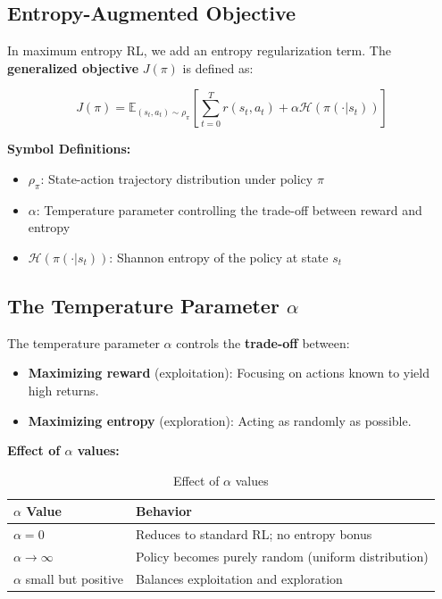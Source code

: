 \documentclass[12pt,a4paper]{article}
\theoremstyle{noteplain}
\theoremstyle{noteexercise}
\begin{document}
\subsection{Entropy-Augmented Objective}\label{ssec:entropy-obj}



In maximum entropy RL, we add an entropy regularization term. The \textbf{generalized objective} $J(\pi)$ is defined as:

\begin{equation}\label{eq:maxent-obj}
\boxed{J(\pi) = \mathbb{E}_{(s_t, a_t) \sim \rho_\pi}\left[\sum_{t=0}^{T} r(s_t, a_t) + \alpha \mathcal{H}(\pi(\cdot|s_t))\right]}
\end{equation}

\textbf{Symbol Definitions:}

\begin{itemize}
  \setlength{\itemsep}{0.2em}
  \item $\rho_\pi$: State-action trajectory distribution under policy $\pi$
  \item $\alpha$: Temperature parameter controlling the trade-off between reward and entropy
  \item $\mathcal{H}(\pi(\cdot|s_t))$: Shannon entropy of the policy at state $s_t$
\end{itemize}



\subsection{The Temperature Parameter $\alpha$}\label{ssec:alpha}



The temperature parameter $\alpha$ controls the \textbf{trade-off} between:

\begin{itemize}
  \item \textbf{Maximizing reward} (exploitation): Focusing on actions known to yield high returns.
  \item \textbf{Maximizing entropy} (exploration): Acting as randomly as possible.
\end{itemize}

\textbf{Effect of $\alpha$ values:}

\begin{table}[H]
  \centering
  \caption{Effect of $\alpha$ values}
  \label{tab:alpha-effect}
  \begin{tabular}{m{4cm}m{6cm}}
    \toprule
    \textbf{$\alpha$ Value} & \textbf{Behavior} \\
    \midrule
    $\alpha = 0$ & Reduces to standard RL; no entropy bonus \\
    $\alpha \to \infty$ & Policy becomes purely random (uniform distribution) \\
    $\alpha$ small but positive & Balances exploitation and exploration \\
    \bottomrule
  \end{tabular}
\end{table}
\end{document}
